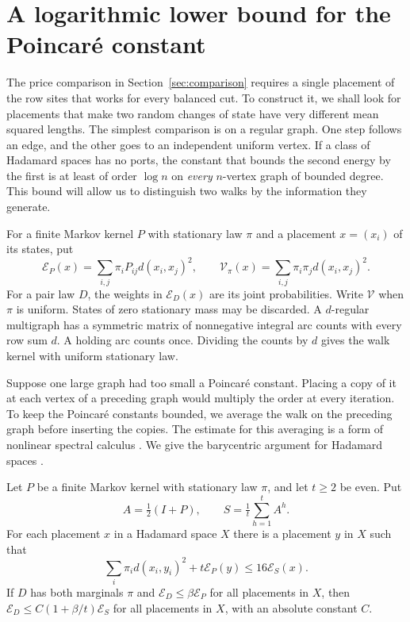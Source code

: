 \section{A logarithmic lower bound for the Poincaré constant}\label{sec:poincare}

The price comparison in Section~\ref{sec:comparison} requires a
single placement of the row sites that works for every balanced cut.
To construct it, we shall look for placements that make two random
changes of state have very different mean squared lengths. The
simplest comparison is on a regular graph. One step follows an edge,
and the other goes to an independent uniform vertex. If a class of
Hadamard spaces has no ports, the constant that bounds the second
energy by the first is at least of order \(\log n\) on \emph{every}
\(n\)-vertex graph of bounded degree. This bound will allow us to
distinguish two walks by the information they generate.

For a finite Markov kernel \(P\) with stationary law \(\pi\) and a
placement \(x=(x_i)\) of its states, put
\[
 \mathcal E_P(x)=\sum_{i,j}\pi_iP_{ij}d(x_i,x_j)^2,\qquad
 \mathcal V_\pi(x)=\sum_{i,j}\pi_i\pi_j d(x_i,x_j)^2 .
\]
For a pair law \(D\), the weights in \(\mathcal E_D(x)\) are its joint
probabilities. Write \(\mathcal V\) when \(\pi\) is uniform. States
of zero stationary mass may be discarded. A \(d\)-regular multigraph
has a symmetric matrix of nonnegative integral arc counts with every
row sum \(d\). A holding arc counts once. Dividing the counts by
\(d\) gives the walk kernel with uniform stationary law.

Suppose one large graph had too small a Poincar\'e constant. Placing
a copy of it at each vertex of a preceding graph would multiply the
order at every iteration. To keep the Poincar\'e constants bounded,
we average the walk on the preceding graph before inserting the
copies. The estimate for this averaging is a form of nonlinear
spectral calculus \cite{MendelNaor,MendelNaorBarycentric}. We give
the barycentric argument for Hadamard spaces
\cite{BH,Sturm}.

\begin{lemma}\label{lem:power}
Let \(P\) be a finite Markov kernel with stationary law \(\pi\), and let
\(t\ge2\) be even. Put
\[
 A=\tfrac12(I+P),\qquad S=\tfrac1t\sum_{h=1}^t A^h .
\]
For each placement \(x\) in a Hadamard space \(X\) there is a placement
\(y\) in \(X\) such that
\begin{equation}\label{eq:hadamard-smoothing}
 \sum_i\pi_i d(x_i,y_i)^2+t\mathcal E_P(y)
 \le 16\mathcal E_S(x).
\end{equation}
If \(D\) has both marginals \(\pi\) and
\(\mathcal E_D\le\beta\mathcal E_P\) for all placements in \(X\), then
\(\mathcal E_D\le C(1+\beta/t)\mathcal E_S\) for all placements in \(X\),
with an absolute constant \(C\).
\end{lemma}

